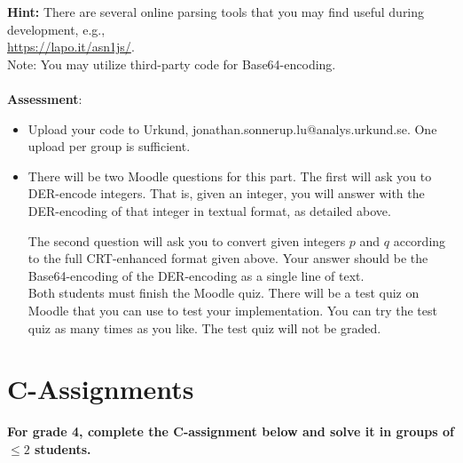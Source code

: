 \documentclass{article}
\begin{document}
\begin{description}
{				\textbf{Hint:} There are several online parsing tools that you may find useful during development, e.g.,\\ 
				\url{https://lapo.it/asn1js/}.\\
				Note: You may utilize third-party code for Base64-encoding.\\\\
				
				\textbf{Assessment}:
				\begin{itemize}
					\item Upload your code to Urkund, jonathan.sonnerup.lu@analys.urkund.se.
					One upload per group is sufficient.
					\item There will be two Moodle questions for this part. The first will ask you to DER-encode integers. That is, given an integer, you will answer with the DER-encoding of that integer in textual format, as detailed above.
					
					The second question will ask you to convert given integers $p$ and $q$ according to the full CRT-enhanced format given above. Your answer should be the Base64-encoding of the DER-encoding as a single line of text.\\
					Both students must finish the Moodle quiz.
					There will be a test quiz on Moodle that you can use to test your implementation. You can try the test quiz as many times as you like. The test quiz will not be graded.
					
				\end{itemize}
			}
		\end{description}

		\clearpage
		
		\section*{C-Assignments}
		\textbf{For grade 4, complete the C-assignment below and solve it in groups of $\leq 2$ students.}
		
\end{document}
